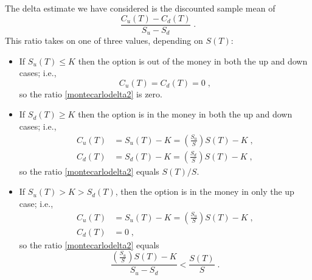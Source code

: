 The delta estimate we have considered is the discounted sample mean of 
\begin{equation}\label{montecarlodelta2}
\frac{C_u(T) - C_d(T)}{S_u-S_d}\;.
\end{equation}
This ratio takes on one of three values, depending on $S(T)$:
\begin{itemize}
\item If $S_u(T) \leq K$ then the option is out of the money in both the up and down cases; i.e., 
$$C_u(T) = C_d(T) = 0\; ,$$
so the ratio \eqref{montecarlodelta2} is zero.
\item If $S_d(T) \geq K$ then the option is in the money in both the up and down cases; i.e.,
\begin{align*} C_u(T) &= S_u(T) - K =\left(\frac{S_u}{S}\right)S(T) - K\; ,\\
C_d(T) &= S_d(T) - K = \left(\frac{S_d}{S}\right)S(T) - K\;,
\end{align*}
so the ratio  \eqref{montecarlodelta2} equals $S(T)/S$.
\item If $S_u(T) > K > S_d(T)$, then the option is in the money in only the up case; i.e.,
\begin{align*}
C_u(T) &= S_u(T) - K = \left(\frac{S_u}{S}\right)S(T) - K\; ,\\
C_d(T) &= 0\;,
\end{align*}
so the ratio \eqref{montecarlodelta2} equals 
$$\frac{\left(\frac{S_u}{S}\right)S(T) - K}{S_u-S_d} < \frac{S(T)}{S}\; .$$
\end{itemize}

